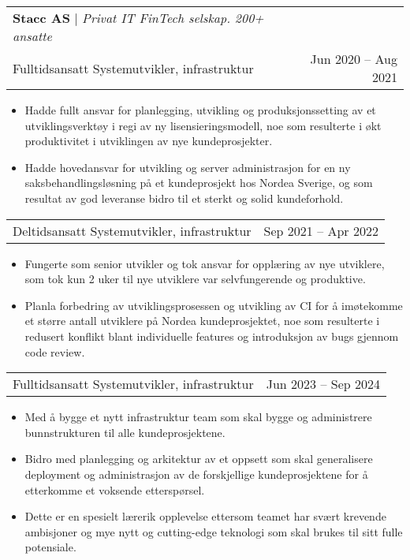\documentclass[letterpaper,11pt]{article}
\makeatletter
\newcommand{\resumeItemListStart}{\begin{itemize}}
\newcommand{\resumeItemListEnd}{\end{itemize}\vspace{-5pt}}
\newcommand{\resumeProjectHeading}[2]{
    \item
    \begin{tabular*}{0.97\textwidth}{l@{\extracolsep{\fill}}r}
      \small#1 & #2 \\
    \end{tabular*}\vspace{-7pt}
}
\makeatother
\begin{document}
        \resumeProjectHeading
            {\textbf{Stacc AS} $|$ \footnotesize\emph{Privat IT FinTech selskap. 200+ ansatte} \\
            \small{Fulltidsansatt Systemutvikler, infrastruktur}}
            {Jun 2020 -- Aug 2021}
            \resumeItemListStart
                \item Hadde fullt ansvar for planlegging, utvikling og produksjonssetting av et utviklingsverktøy i regi av ny lisensieringsmodell, noe som resulterte i økt produktivitet i utviklingen av nye kundeprosjekter.
                \item Hadde hovedansvar for utvikling og server administrasjon for en ny saksbehandlingsløsning på et kundeprosjekt hos Nordea Sverige, og som resultat av god leveranse bidro til et sterkt og solid kundeforhold.
            \resumeItemListEnd
            
        \resumeProjectHeading
            {\small{Deltidsansatt Systemutvikler, infrastruktur}}
            {Sep 2021 -- Apr 2022}
            \resumeItemListStart
                \item Fungerte som senior utvikler og tok ansvar for opplæring av nye utviklere, som tok kun 2 uker til nye utviklere var selvfungerende og produktive.
                \item Planla forbedring av utviklingsprosessen og utvikling av CI for å imøtekomme et større antall utviklere på Nordea kundeprosjektet, noe som resulterte i redusert konflikt blant individuelle features og introduksjon av bugs gjennom code review.
            \resumeItemListEnd
            
        \resumeProjectHeading
            {\small{Fulltidsansatt Systemutvikler, infrastruktur}}
            {Jun 2023 -- Sep 2024}
            \resumeItemListStart
                \item Med å bygge et nytt infrastruktur team som skal bygge og administrere bunnstrukturen til alle kundeprosjektene.
                \item Bidro med planlegging og arkitektur av et oppsett som skal generalisere deployment og administrasjon av de forskjellige kundeprosjektene for å etterkomme et voksende etterspørsel.
                \item Dette er en spesielt lærerik opplevelse ettersom teamet har svært krevende ambisjoner og mye nytt og cutting-edge teknologi som skal brukes til sitt fulle potensiale.
            \resumeItemListEnd
            
\end{document}

